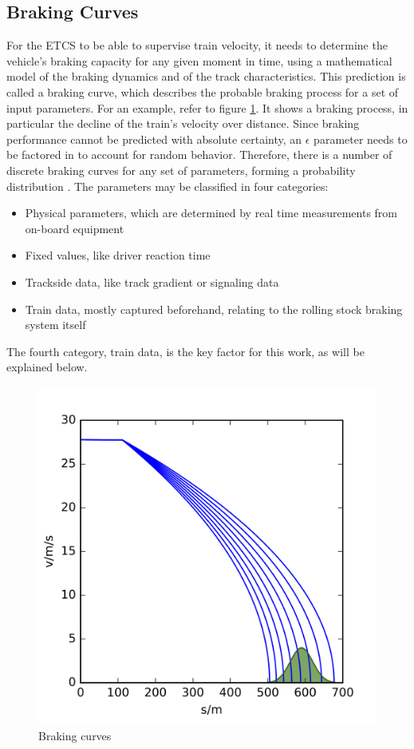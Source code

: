 \subsection{Braking Curves}
\label{sec:BrakingCurves}
\par\noindent
For the ETCS to be able to supervise train velocity, it needs to determine the vehicle's braking capacity for any given moment in time, using a mathematical model of the braking dynamics and of the track characteristics. This prediction is called a braking curve, which describes the probable braking process for a set of input parameters. For an example, refer to figure \ref{fig:brakingcurves}. It shows a braking process, in particular the decline of the train's velocity over distance. Since braking performance cannot be predicted with absolute certainty, an $\epsilon$ parameter needs to be factored in to account for random behavior. Therefore, there is a number of discrete braking curves for any set of parameters, forming a probability distribution \cite{Pfaff2017}. The parameters may be classified in four categories:
\begin{itemize}
	\item Physical parameters, which are determined by real time measurements from on-board equipment
	\item Fixed values, like driver reaction time
	\item Trackside data, like track gradient or signaling data
	\item Train data, mostly captured beforehand, relating to the rolling stock braking system itself
\end{itemize}
The fourth category, train data, is the key factor for this work, as will be explained below.

\begin{figure}[H]
	\centering
	\includegraphics[scale=0.2]{./pic/171026_Transrail_BrakingCurves-14}
	\caption{Braking curves \cite{Pfaff2017}}
	\label{fig:brakingcurves}
\end{figure}

